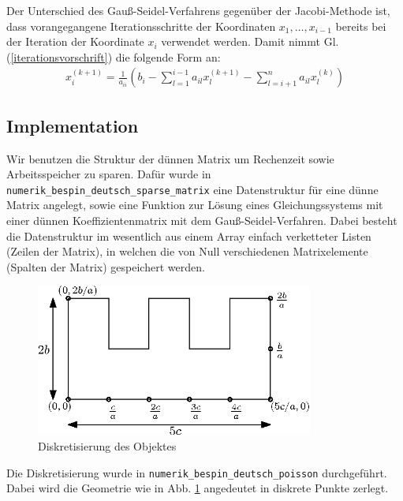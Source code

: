 \documentclass[10pt,a4paper]{article}
\begin{document}
Der Unterschied des Gauß-Seidel-Verfahrens gegenüber der Jacobi-Methode ist, dass vorangegangene Iterationsschritte der Koordinaten $x_1, \dots , x_{i-1}$ bereits bei der Iteration der Koordinate $x_i$ verwendet werden. Damit nimmt Gl. (\ref{iterationsvorschrift}) die folgende Form an:
\begin{align}
x_i^{(k+1)} = \frac{1}{a_{ii}}\left( b_i - \sum^{i-1}_{l=1} a_{il} x_l^{(k+1)} - \sum^{n}_{l=i+1} a_{il} x_l^{(k)} \right) 
\end{align}

\subsection{Implementation}
Wir benutzen die Struktur der dünnen Matrix um Rechenzeit sowie Arbeitsspeicher zu sparen. Dafür wurde in \texttt{numerik\_bespin\_deutsch\_sparse\_matrix} eine Datenstruktur für eine dünne Matrix angelegt, sowie eine Funktion zur Lösung eines Gleichungssystems mit einer dünnen Koeffizientenmatrix mit dem Gauß-Seidel-Verfahren. Dabei besteht die Datenstruktur im wesentlich aus einem Array einfach verketteter Listen (Zeilen der Matrix), in welchen die von Null verschiedenen Matrixelemente (Spalten der Matrix) gespeichert werden.

\begin{figure}
\centering
\includegraphics[height=5cm]{./figures/grid.eps}
\caption{Diskretisierung des Objektes}
\label{geometrie}
\end{figure}

Die Diskretisierung wurde in \texttt{numerik\_bespin\_deutsch\_poisson} durchgeführt. Dabei wird die Geometrie wie in Abb. \ref{geometrie} angedeutet in diskrete Punkte zerlegt.
\end{document}
